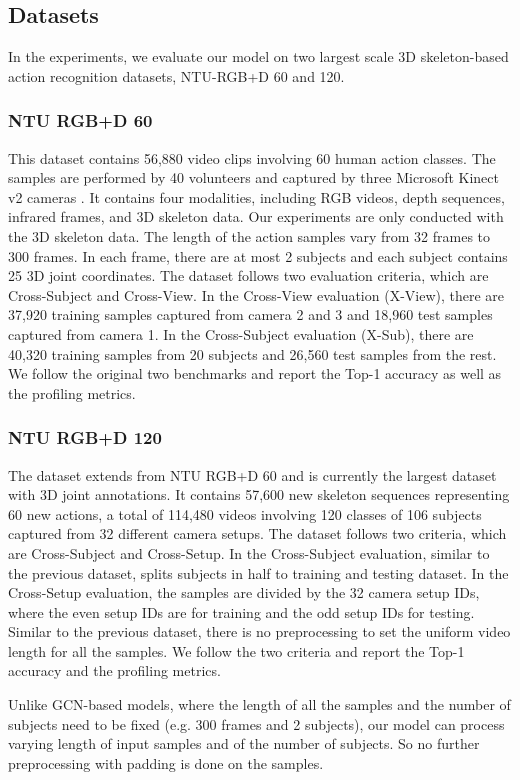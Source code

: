 \documentclass[letterpaper]{article} %
\begin{document}
\subsection{Datasets}
In the experiments, we evaluate our model on two largest scale 3D skeleton-based action recognition datasets, NTU-RGB+D 60 and 120. 
\subsubsection{NTU RGB+D 60}
This dataset contains 56,880 video clips involving 60 human action classes. The samples are performed by 40 volunteers and captured by three Microsoft Kinect v2 cameras \cite{shahroudy2016ntu}. It contains four modalities, including RGB videos, depth sequences, infrared frames, and 3D skeleton data. Our experiments are only conducted with the 3D skeleton data. The length of the action samples vary from 32 frames to 300 frames. In each frame, there are at most 2 subjects and each subject contains 25 3D joint coordinates. The dataset follows two evaluation criteria, which are Cross-Subject and Cross-View. In the Cross-View evaluation (X-View), there are 37,920 training samples captured from camera 2 and 3 and 18,960 test samples captured from camera 1. In the Cross-Subject evaluation (X-Sub), there are 40,320 training samples from 20 subjects and 26,560 test samples from the rest. We follow the original two benchmarks and report the Top-1 accuracy as well as the profiling metrics.
\subsubsection{NTU RGB+D 120}
The dataset \cite{liu2019ntu} extends from NTU RGB+D 60 and is currently the largest dataset with 3D joint annotations. It contains 57,600 new skeleton sequences representing 60 new actions, a total of 114,480 videos involving 120 classes of 106 subjects captured from 32 different camera setups. The dataset follows two criteria, which are Cross-Subject and Cross-Setup. In the Cross-Subject evaluation, similar to the previous dataset, splits subjects in half to training and testing dataset. In the Cross-Setup evaluation, the samples are divided by the 32 camera setup IDs, where the even setup IDs are for training and the odd setup IDs for testing. Similar to the previous dataset, there is no preprocessing to set the uniform video length for all the samples. We follow the two criteria and report the Top-1 accuracy and the profiling metrics.

Unlike GCN-based models, where the length of all the samples and the number of subjects need to be fixed (e.g. 300 frames and 2 subjects), our model can process varying length of input samples and of the number of subjects. So no further preprocessing with padding is done on the samples.
\end{document}
